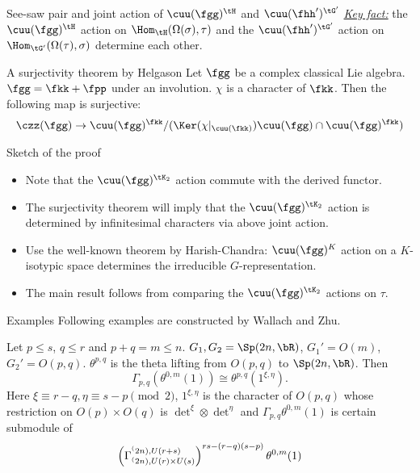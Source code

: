 \documentclass[final,hyperref={pdfpagelabels=false}]{beamer} %
\def\emph#1{{\em \underline{#1}}}
\begin{document}
\begin{frame}
\begin{columns}[t]
\begin{column}{.48\linewidth}
\begin{block}{See-saw pair and  joint action of $\cuu(\fgg)^\tH$ 
and $\cuu(\fhh')^{\tG'}$}
\emph{Key fact:} the $\cuu(\fgg)^\tH$ action on $\Hom_\tH(\Omega(\sigma),\tau)$ and the $\cuu(\fhh')^{\tG'}$  action on $\Hom_{\tG'}(\Omega(\tau),\sigma)$ determine  each other.
\end{block}

\begin{block}{A surjectivity theorem by Helgason}
  Let $\fgg$ be a complex classical Lie algebra.  
  $\fgg = \fkk+\fpp$ under an involution. 
  $\chi$ is a character of $\fkk$.
   Then the following map is surjective:
  \[
  \czz(\fgg) \to \cuu(\fgg)^\fkk/(\Ker(\chi|_{\cuu(\fkk)})\cuu(\fgg)\cap\cuu(\fgg)^\fkk)
  \]
\end{block}

\begin{block}{Sketch of the proof}
  \begin{itemize}
  \item 
  Note that the $\cuu(\fgg)^{\tK_2}$ action commute with the derived functor.
\item 
  The surjectivity theorem will imply that the $\cuu(\fgg)^{\tK_2}$ action is determined by
  infinitesimal characters via above joint action.
\item Use the well-known theorem by Harish-Chandra: $\cuu(\fgg)^{K}$ action on a $K$-isotypic space determines the  irreducible $G$-representation.
\item 
  The main result follows from comparing the $\cuu(\fgg)^{\tK_2}$ actions on $\tau$.
\end{itemize}
% 
\end{block}

\begin{block}{Examples}
      Following examples are constructed by Wallach and Zhu.

      Let $p\leq s$, $q\leq r$ and $p+q=m\leq n$.  
      $G_1,G_2 = \Sp(2n,\bR)$, $G_1' = O(m)$, $G_2'=O(p,q)$.
      $\theta^{p,q}$ is the theta lifting from $O(p,q)$ to
      $\Sp(2n,\bR)$. Then 
      \[
      \displaystyle
      \Gamma_{p,q}(\theta^{0,m}(1)) \cong \theta^{p,q}(1^{\xi,\eta}).\]
      Here $ \xi \equiv r-q, \eta\equiv s-p \pmod{2}$,
      $1^{\xi,\eta}$ is the character of $O(p,q)$
      whose restriction on $O(p)\times O(q)$ is
      $\det^\xi\otimes \det^\eta$ and
      $\Gamma_{p,q}\theta^{0,m}(1)$ is certain submodule of
      \[
      \left(\Gamma_{\sp(2n),U(r)\times U(s)}^{\sp(2n),
          U(r+s)}\right)^{rs-(r-q)(s-p)}\theta^{0,m}(1)
      \]
    \end{block}
 

\end{column}
\end{columns}
\end{frame}
\end{document}
